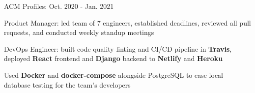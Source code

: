 
\begin{cventries}

  \cvproject
  {ACM Profiles: } %
  {Oct. 2020 - Jan. 2021} %
  {
    \begin{cvitems} %
      \item {Product Manager: led team of 7 engineers, established deadlines, reviewed all pull requests, and conducted weekly standup meetings}
      \item {DevOps Engineer: built code quality linting and CI/CD pipeline in \textbf{Travis}, deployed \textbf{React} frontend and \textbf{Django} backend to \textbf{Netlify} and \textbf{Heroku}}
      \item {Used \textbf{Docker} and \textbf{docker-compose} alongside PostgreSQL to ease local database testing for the team's developers}
    \end{cvitems}
  }



\end{cventries}
